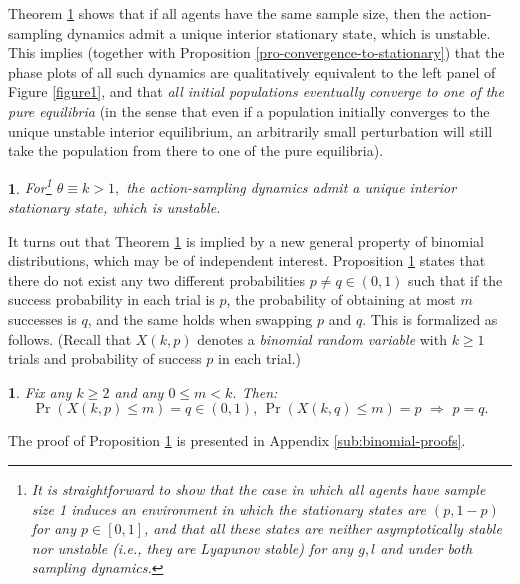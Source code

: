 \documentclass[12pt]{article}
\numberwithin{equation}{section}
\numberwithin{figure}{section}
\theoremstyle{definition}
\theoremstyle{plain}
\theoremstyle{plain}
\newtheorem{prop}{\protect\propositionname}
\theoremstyle{plain}
\newtheorem{thm}{\protect\theoremname}
\theoremstyle{remark}
\theoremstyle{plain}
\theoremstyle{plain}
\providecommand{\propositionname}{Proposition}
\providecommand{\theoremname}{Theorem}
\begin{document}
Theorem \ref{thm:unstableinterior_ASD} shows that if all agents have the same sample size, then the action-sampling dynamics admit a unique interior stationary state, which is unstable. This implies (together with Proposition \ref{pro-convergence-to-stationary}) that the phase plots of all such dynamics are qualitatively equivalent to the left panel of Figure \ref{figure1}, and that \emph{all initial populations eventually converge to one of the pure equilibria}
(in the sense that even if a population initially converges to the unique unstable interior equilibrium, an arbitrarily small perturbation will still take the population from there to one of the pure equilibria). 
\begin{thm}\label{thm:unstableinterior_ASD}
For\footnote{\label{foot-k-1}
It is straightforward to show that the case in which all agents have sample size 1 induces an environment in which the stationary states are $(p,1-p)$ for any $p\in[0,1]$, and that all these states are neither asymptotically stable nor 
unstable (i.e., they are Lyapunov stable) for any $g,l$ and under both sampling dynamics.} 
$\theta\equiv k>1,$ the action-sampling dynamics admit a unique interior stationary state, which is unstable.
\end{thm}

It turns out that Theorem \ref{thm:unstableinterior_ASD} is implied by a new general property of binomial distributions, which may be of independent interest. Proposition \ref{pro-binomial} states that there do not exist any two different probabilities $p\neq q\in(0,1)$ such that if the success probability in each trial is $p$, the probability of obtaining at most $m$ successes is $q$, and the same holds when swapping $p$ and $q$. 
This is formalized as follows. (Recall that $X(k,p)$ denotes a \emph{binomial random variable} with $k\geq1$ trials and probability of success $p$ in each trial.)

\begin{prop} \label{pro-binomial}
Fix any $k\geq2$ and any $0\leq m<k$. Then: 
\[
\Pr\left(X(k,p)\leq m\right)=q\in\left(0,1\right),\,\Pr\left(X(k,q)\leq m\right)=p\,\,\Rightarrow\,\, p=q.
\]
\end{prop}

The proof of Proposition \ref{pro-binomial} is presented in Appendix \ref{sub:binomial-proofs}.
\end{document}
